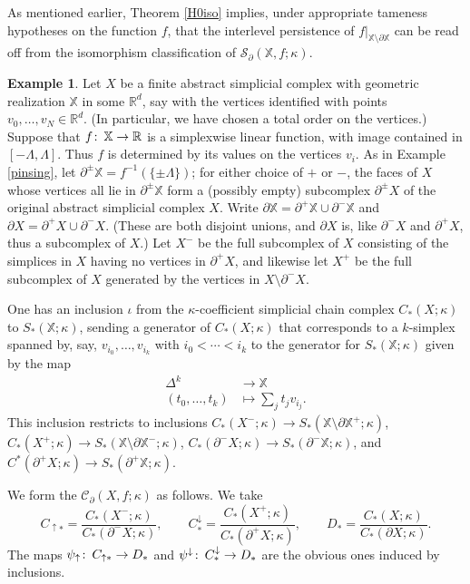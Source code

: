 \documentclass[11pt]{amsart}
\theoremstyle{definition}
\newtheorem{ex}[theorem]{Example}
\theoremstyle{remark}
\numberwithin{equation}{section}
\def\co{\colon\thinspace}
\def\R{\mathbb{R}}
\begin{document}
As mentioned earlier, Theorem \ref{H0iso} implies, under appropriate tameness hypotheses on the function $f$, that the interlevel persistence of $f|_{\mathbb{X}\setminus\partial\mathbb{X}}$ can be read off from the isomorphism classification of $\mathcal{S}_{\partial}(\mathbb{X},f;\kappa)$.

\begin{ex}\label{simpdef}
	Let $X$ be a finite abstract simplicial complex with geometric realization $\mathbb{X}$ in some $\R^d$, say with the vertices identified with points $v_0,\ldots,v_N\in \R^d$. (In particular, we have chosen a total order on the vertices.) Suppose that $f\co \mathbb{X}\to \R$ is a simplexwise linear function, with image contained in $[-\Lambda,\Lambda]$. Thus $f$ is determined by its values on the vertices $v_i$.  As in Example \ref{pinsing}, let $\partial^{\pm}\mathbb{X}=f^{-1}(\{\pm\Lambda\})$; for either choice of $+$ or $-$, the faces of $X$ whose vertices all lie in $\partial^{\pm}\mathbb{X}$ form a (possibly empty) subcomplex $\partial^{\pm}X$ of the original abstract simplicial complex $X$.  Write $\partial \mathbb{X}=\partial^{+}\mathbb{X}\cup\partial^-\mathbb{X}$ and $\partial X=\partial^+X\cup\partial^-X$. (These are both disjoint unions, and $\partial X$ is, like $\partial^-X$ and $\partial^+X$, thus a subcomplex of $X$.) 
	Let $X^-$ be the full subcomplex of $X$ consisting of the simplices in $X$ having no vertices in $\partial^+X$, and likewise let $X^+$ be the full subcomplex of $X$ generated by the vertices in $X\setminus \partial^-X$.  
	
	
	One has an inclusion $\iota$ from the $\kappa$-coefficient simplicial chain complex $C_*(X;\kappa)$ to $S_*(\mathbb{X};\kappa)$, sending a generator of $C_*(X;\kappa)$ that corresponds to a $k$-simplex spanned by, say, $v_{i_0},\ldots,v_{i_k}$ with $i_0<\cdots<i_k$ to the generator for $S_*(\mathbb{X};\kappa)$ given by the map \begin{align*} \Delta^k &\to \mathbb{X} \\ (t_0,\ldots,t_k) &\mapsto \sum_j t_jv_{i_j}.  \end{align*}  This inclusion restricts to inclusions $C_*(X^-;\kappa)\to S_*(\mathbb{X}\setminus \partial \mathbb{X}^+;\kappa)$, $C_*(X^+;\kappa)\to S_*(\mathbb{X}\setminus \partial \mathbb{X}^-;\kappa)$, $C_*(\partial^-X;\kappa)\to S_*(\partial^-\mathbb{X};\kappa)$, and $C^*(\partial^+X;\kappa)\to S_*(\partial^+\mathbb{X};\kappa)$.  
	
	We form the  $\mathcal{C}_{\partial}(X,f;\kappa)$ as follows.  We take \[ C_{\uparrow *}=\frac{C_{*}(X^-;\kappa)}{C_*(\partial^-X;\kappa)},\qquad C^{\downarrow}_{*}=\frac{C_*(X^+;\kappa)}{C_*(\partial^+X;\kappa)},\qquad D_*=\frac{C_*(X;\kappa)}{C_*(\partial X;\kappa)}. \] The maps $\psi_{\uparrow}\co C_{\uparrow *}\to D_*$ and $\psi^{\downarrow}\co C^{\downarrow}_{*}\to D_*$ are the obvious ones induced by inclusions.  
	

\end{ex}
\end{document}
